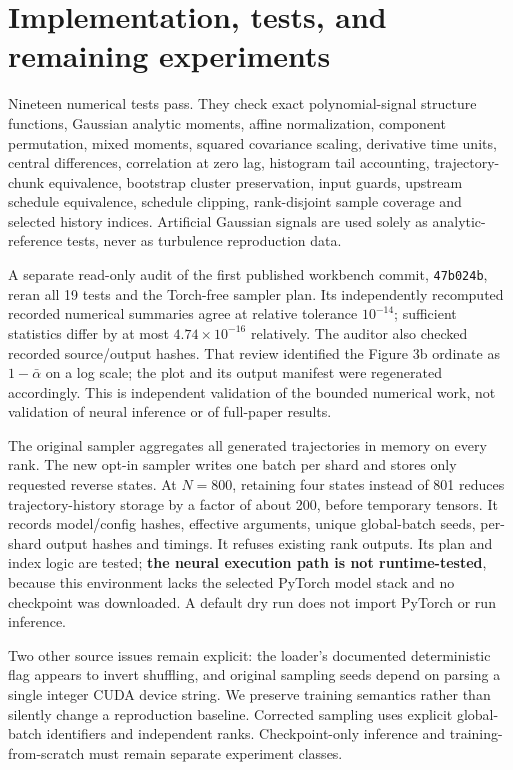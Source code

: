 \documentclass[10pt,a4paper]{article}
\begin{document}
\section{Implementation, tests, and remaining experiments}
Nineteen numerical tests pass. They check exact polynomial-signal structure functions, Gaussian analytic moments, affine normalization, component permutation, mixed moments, squared covariance scaling, derivative time units, central differences, correlation at zero lag, histogram tail accounting, trajectory-chunk equivalence, bootstrap cluster preservation, input guards, upstream schedule equivalence, schedule clipping, rank-disjoint sample coverage and selected history indices. Artificial Gaussian signals are used solely as analytic-reference tests, never as turbulence reproduction data.

A separate read-only audit of the first published workbench commit, \texttt{47b024b}, reran all 19 tests and the Torch-free sampler plan. Its independently recomputed recorded numerical summaries agree at relative tolerance $10^{-14}$; sufficient statistics differ by at most $4.74\times10^{-16}$ relatively. The auditor also checked recorded source/output hashes. That review identified the Figure 3b ordinate as $1-\bar\alpha$ on a log scale; the plot and its output manifest were regenerated accordingly. This is independent validation of the bounded numerical work, not validation of neural inference or of full-paper results.

The original sampler aggregates all generated trajectories in memory on every rank. The new opt-in sampler writes one batch per shard and stores only requested reverse states. At $N=800$, retaining four states instead of 801 reduces trajectory-history storage by a factor of about 200, before temporary tensors. It records model/config hashes, effective arguments, unique global-batch seeds, per-shard output hashes and timings. It refuses existing rank outputs. Its plan and index logic are tested; \textbf{the neural execution path is not runtime-tested}, because this environment lacks the selected PyTorch model stack and no checkpoint was downloaded. A default dry run does not import PyTorch or run inference.

Two other source issues remain explicit: the loader's documented deterministic flag appears to invert shuffling, and original sampling seeds depend on parsing a single integer CUDA device string. We preserve training semantics rather than silently change a reproduction baseline. Corrected sampling uses explicit global-batch identifiers and independent ranks. Checkpoint-only inference and training-from-scratch must remain separate experiment classes.
\end{document}
